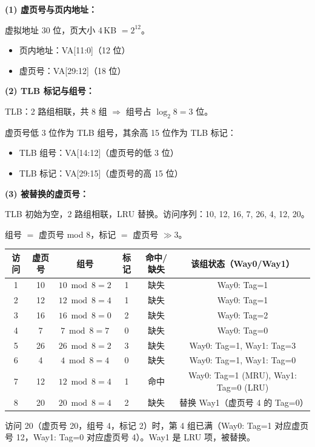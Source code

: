 \documentclass[12pt,a4paper]{ctexart}
\begin{document}
\begin{enumerate}[leftmargin=*,resume]
\medskip
\textbf{(1) 虚页号与页内地址：}

虚拟地址 30 位，页大小 4\,KB $= 2^{12}$。
\begin{itemize}
\item 页内地址：VA[11:0]（12 位）
\item 虚页号：VA[29:12]（18 位）
\end{itemize}

\textbf{(2) TLB 标记与组号：}

TLB：2 路组相联，共 8 组 $\Rightarrow$ 组号占 $\log_2 8 = 3$ 位。

虚页号低 3 位作为 TLB 组号，其余高 15 位作为 TLB 标记：
\begin{itemize}
\item TLB 组号：VA[14:12]（虚页号的低 3 位）
\item TLB 标记：VA[29:15]（虚页号的高 15 位）
\end{itemize}

\textbf{(3) 被替换的虚页号：}

TLB 初始为空，2 路组相联，LRU 替换。访问序列：10, 12, 16, 7, 26, 4, 12, 20。

组号 $=$ 虚页号 mod 8，标记 $=$ 虚页号 $\gg 3$。

\begin{center}
\begin{tabular}{c|c|c|c|c|c}
访问 & 虚页号 & 组号 & 标记 & 命中/缺失 & 该组状态（Way0/Way1） \\
\hline
1 & 10 & $10 \bmod 8 = 2$ & 1 & 缺失 & Way0: Tag=1 \\
2 & 12 & $12 \bmod 8 = 4$ & 1 & 缺失 & Way0: Tag=1 \\
3 & 16 & $16 \bmod 8 = 0$ & 2 & 缺失 & Way0: Tag=2 \\
4 & 7  & $7 \bmod 8 = 7$  & 0 & 缺失 & Way0: Tag=0 \\
5 & 26 & $26 \bmod 8 = 2$ & 3 & 缺失 & Way0: Tag=1, Way1: Tag=3 \\
6 & 4  & $4 \bmod 8 = 4$  & 0 & 缺失 & Way0: Tag=1, Way1: Tag=0 \\
7 & 12 & $12 \bmod 8 = 4$ & 1 & 命中 & Way0: Tag=1 (MRU), Way1: Tag=0 (LRU) \\
8 & 20 & $20 \bmod 8 = 4$ & 2 & 缺失 & 替换 Way1（虚页号 4 的 Tag=0）\\
\end{tabular}
\end{center}

访问 20（虚页号 20，组号 4，标记 2）时，第 4 组已满（Way0: Tag=1 对应虚页号 12，Way1: Tag=0 对应虚页号 4）。Way1 是 LRU 项，被替换。


\end{enumerate}
\end{document}
